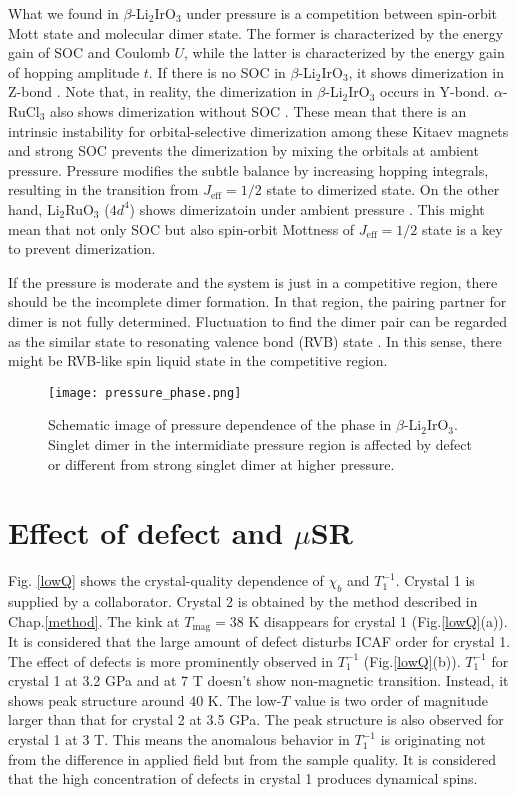What we found in $\beta$-Li$_2$IrO$_3$ under pressure is a competition between spin-orbit Mott state and molecular dimer state.
The former is characterized by the energy gain of SOC and Coulomb $U$, while the latter is characterized by the energy gain of hopping amplitude $t$.
If there is no SOC in $\beta$-Li$_2$IrO$_3$, it shows dimerization in Z-bond \cite{Kim2016}.
Note that, in reality, the dimerization in $\beta$-Li$_2$IrO$_3$ occurs in Y-bond.
$\alpha$-RuCl$_3$ also shows dimerization without SOC \cite{Kim2016a}.
These mean that there is an intrinsic instability for orbital-selective dimerization among these Kitaev magnets and strong SOC prevents the dimerization
by mixing the orbitals at ambient pressure.
Pressure modifies the subtle balance by increasing hopping integrals, resulting in the transition from $J_\mathrm{eff} = 1/2$ state to dimerized state.
On the other hand, Li$_2$RuO$_3$ ($4d^4$) shows dimerizatoin under ambient pressure \cite{Miura2007}.
This might mean that not only SOC but also spin-orbit Mottness of $J_\mathrm{eff} = 1/2$ state is a key to prevent dimerization.

If the pressure is moderate and the system is just in a competitive region, there should be the incomplete dimer formation.
In that region, the pairing partner for dimer is not fully determined.
Fluctuation to find the dimer pair can be regarded as the similar state to resonating valence bond (RVB) state \cite{ANDERSON1973153}.
In this sense, there might be RVB-like spin liquid state in the competitive region.

\begin{figure}[H]
  \centering
  \texttt{[image: pressure\_phase.png]}
  \caption{Schematic image of pressure dependence of the phase in $\beta$-Li$_2$IrO$_3$.
  Singlet dimer in the intermidiate pressure region is affected by defect or different from strong singlet dimer at higher pressure.}
  \label{pressure_phase}
\end{figure}

\section{Effect of defect and $\mu$SR}
Fig. \ref{lowQ} shows the crystal-quality dependence of $\chi_b$ and $T^{-1}_1$.
Crystal 1 is supplied by a collaborator.
Crystal 2 is obtained by the method described in Chap.\ref{method}.
The kink at $T_\mathrm{mag} = 38$ K disappears for crystal 1 (Fig.\ref{lowQ}(a)).
It is considered that the large amount of defect disturbs ICAF order for crystal 1.
The effect of defects is more prominently observed in $T^{-1}_1$ (Fig.\ref{lowQ}(b)).
$T^{-1}_1$ for crystal 1 at 3.2 GPa and at 7 T doesn't show non-magnetic transition.
Instead, it shows peak structure around 40 K.
The low-$T$ value is two order of magnitude larger than that for crystal 2 at 3.5 GPa.
The peak structure is also observed for crystal 1 at 3 T.
This means the anomalous behavior in $T^{-1}_1$ is originating not from the difference in applied field but from the sample quality.
It is considered that the high concentration of defects in crystal 1 produces dynamical spins.

